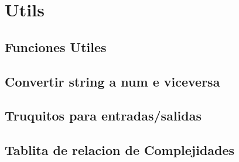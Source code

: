 \section{Utils}
\subsection{Funciones Utiles}

\subsection{Convertir string a num e viceversa}

\subsection{Truquitos para entradas/salidas}

\subsection{Tablita de relacion de Complejidades}

